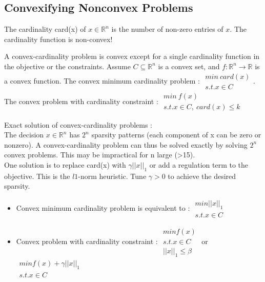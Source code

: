 \documentclass[../main.tex]{subfiles}
\begin{document}
\subsection{Convexifying Nonconvex Problems}
\begin{theorem}
    The cardinality card(x) of $x \in \mathbb{R}^n$ is the number of non-zero entries of $x$. The cardinality function is non-convex!
\end{theorem}
A convex-cardinality problem is convex except for a single cardinality function in the objective or the constraints. Assume $C \subseteq \mathbb{R}^n$ is a convex set, and $f: \mathbb{R}^n \rightarrow \mathbb{R}$ is a convex function. The convex minimum cardinality problem : $\begin{matrix}
    min \: card(x)\\
    s.t. x \in C
\end{matrix}$. The convex problem with cardinality constraint : $\begin{matrix}
    min \: f(x)\\
    s.t. x\in C, \: card(x)\leq k
\end{matrix}$

Exact solution of convex-cardinality problems :\\
The decision $x\in \mathbb{R}^n$ has $2^n$ sparsity patterns (each component of x can be zero or nonzero). A convex-cardinality problem can thus be solved exactly by solving $2^n$ convex problems. This may be impractical for n large (>15).\\
One solution is to replace card(x) with $\gamma \lvert \lvert x \rvert \rvert_1$ or add a regulation term to the objective. This is the $l1$-norm heuristic. Tune $\gamma > 0$ to achieve the desired sparsity.\\
\begin{itemize}
    \item Convex minimum cardinality problem is equivalent to : $\begin{matrix}
        min \lvert \lvert x \rvert \rvert_1\\
        s.t. x\in C
    \end{matrix}$
    \item Convex problem with cardinality constraint : $\begin{matrix}
        min f(x) \\
        s.t. x\in C\\
        \lvert \lvert x \rvert \rvert_1 \leq \beta
    \end{matrix}$ or $\begin{matrix}
        min f(x) + \gamma \lvert \lvert x \rvert\rvert_1\\
        s.t. x\in C
    \end{matrix}$
\end{itemize}
\end{document}
